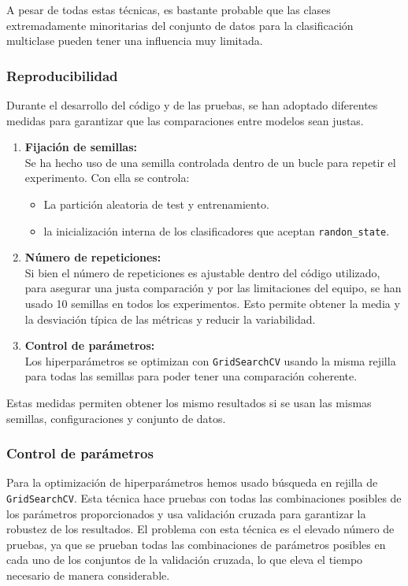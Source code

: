 A pesar de todas estas técnicas, es bastante probable que las clases extremadamente minoritarias del conjunto de datos para la clasificación multiclase pueden tener una influencia muy limitada.

\newpage
\subsubsection{Reproducibilidad}
\label{subsubsec:reproducibilidad}

Durante el desarrollo del código y de las pruebas, se han adoptado diferentes medidas para garantizar que las comparaciones entre modelos sean justas.

\begin{enumerate}
	\item \textbf{Fijación de semillas:}\\
		Se ha hecho uso de una semilla controlada dentro de un bucle para repetir el experimento. Con ella se controla:

		\begin{itemize}
			\item La partición aleatoria de test y entrenamiento.
			\item la inicialización interna de los clasificadores que aceptan \texttt{randon\_state}.
		\end{itemize}
	\item \textbf{Número de repeticiones:}\\
		Si bien el número de repeticiones es ajustable dentro del código utilizado, para asegurar una justa comparación y por las limitaciones del equipo, se han usado 10 semillas en todos los experimentos. Esto permite obtener la media y la desviación típica de las métricas y reducir la variabilidad.
	\item \textbf{Control de parámetros:}\\
		Los hiperparámetros se optimizan con \texttt{GridSearchCV} usando la misma rejilla para todas las semillas para poder tener una comparación coherente.
\end{enumerate}

Estas medidas permiten obtener los mismo resultados si se usan las mismas semillas, configuraciones y conjunto de datos.

\subsubsection{Control de parámetros}
\label{subsubsec:control}

Para la optimización de hiperparámetros hemos usado búsqueda en rejilla de \texttt{GridSearchCV}. Esta técnica hace pruebas con todas las combinaciones posibles de los parámetros proporcionados y usa validación cruzada para garantizar la robustez de los resultados. El problema con esta técnica es el elevado número de pruebas, ya que se prueban todas las combinaciones de parámetros posibles en cada uno de los conjuntos de la validación cruzada, lo que eleva el tiempo necesario de manera considerable.

